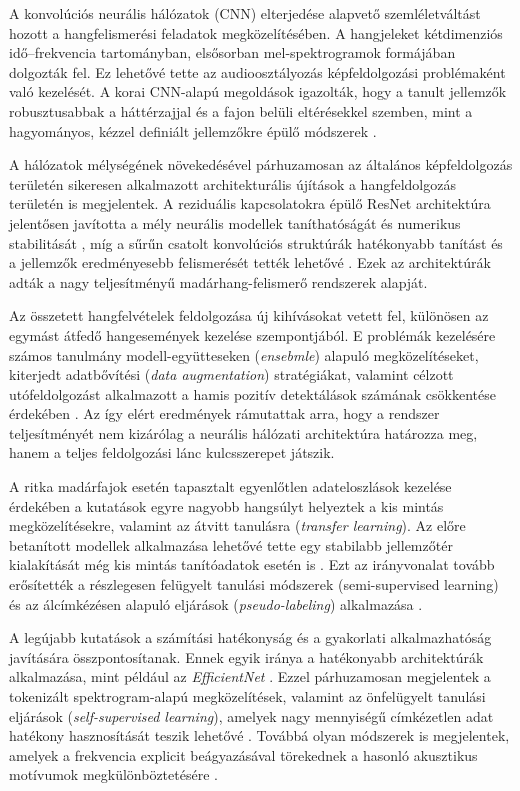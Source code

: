 \documentclass[journal]{IEEEtran}
\begin{document}
  A konvolúciós neurális hálózatok (CNN) elterjedése alapvető szemléletváltást hozott a hangfelismerési feladatok megközelítésében. A hangjeleket kétdimenziós idő--frekvencia tartományban, elsősorban mel-spektrogramok formájában dolgozták fel. Ez lehetővé tette az audioosztályozás képfeldolgozási problémaként való kezelését. A korai CNN-alapú megoldások igazolták, hogy a tanult jellemzők robusztusabbak a háttérzajjal és a fajon belüli eltérésekkel szemben, mint a hagyományos, kézzel definiált jellemzőkre épülő módszerek \cite{Grill2017, lasseck2018, kahl2018}.

  A hálózatok mélységének növekedésével párhuzamosan az általános képfeldolgozás területén sikeresen alkalmazott architekturális újítások a hangfeldolgozás területén is megjelentek. A reziduális kapcsolatokra épülő ResNet architektúra jelentősen javította a mély neurális modellek taníthatóságát és numerikus stabilitását \cite{he2015}, míg a sűrűn csatolt konvolúciós struktúrák hatékonyabb tanítást és a jellemzők eredményesebb felismerését tették lehetővé \cite{huang2018}. Ezek az architektúrák adták a nagy teljesítményű madárhang-felismerő rendszerek alapját.

  Az összetett hangfelvételek feldolgozása új kihívásokat vetett fel, különösen az egymást átfedő hangesemények kezelése szempontjából. E problémák kezelésére számos tanulmány modell-együtteseken (\emph{ensebmle}) alapuló megközelítéseket, kiterjedt adatbővítési (\emph{data augmentation}) stratégiákat, valamint célzott utófeldolgozást alkalmazott a hamis pozitív detektálások számának csökkentése érdekében \cite{conde2021, kahl2021}. Az így elért eredmények rámutattak arra, hogy a rendszer teljesítményét nem kizárólag a neurális hálózati architektúra határozza meg, hanem a teljes feldolgozási lánc kulcsszerepet játszik.

  A ritka madárfajok esetén tapasztalt egyenlőtlen adateloszlások kezelése érdekében a kutatások egyre nagyobb hangsúlyt helyeztek a kis mintás megközelítésekre, valamint az átvitt tanulásra (\emph{transfer learning}). Az előre betanított modellek alkalmazása lehetővé tette egy stabilabb jellemzőtér kialakítását még kis mintás tanítóadatok esetén is \cite{conde2022, miyaguchi2022}. Ezt az irányvonalat tovább erősítették a részlegesen felügyelt tanulási módszerek (semi-supervised learning) és az álcímkézésen alapuló eljárások (\emph{pseudo-labeling}) alkalmazása \cite{miyaguchi2023, miyaguchi2024}.

  A legújabb kutatások a számítási hatékonyság és a gyakorlati alkalmazhatóság javítására összpontosítanak. Ennek egyik iránya a hatékonyabb architektúrák alkalmazása, mint például az \emph{EfficientNet} \cite{tan2021}. Ezzel párhuzamosan megjelentek a tokenizált spektrogram-alapú megközelítések, valamint az önfelügyelt tanulási eljárások (\emph{self-supervised learning}), amelyek nagy mennyiségű címkézetlen adat hatékony hasznosítását teszik lehetővé \cite{miyaguchi2025}. Továbbá olyan módszerek is megjelentek, amelyek a frekvencia explicit beágyazásával törekednek a hasonló akusztikus motívumok megkülönböztetésére \cite{r2025}.
\end{document}
